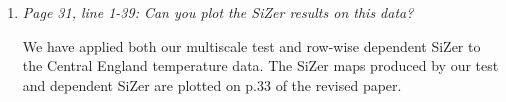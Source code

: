\documentclass[a4paper,12pt]{article}
\begin{document}
\begin{enumerate}[label=(\arabic*),leftmargin=0.7cm]
\item \textit{Page 31, line 1-39: Can you plot the SiZer results on this data?}

We have applied both our multiscale test and row-wise dependent SiZer to the Central England temperature data. The SiZer maps produced by our test and dependent SiZer are plotted on p.33 of the revised paper.  

\end{enumerate}



\newpage

{\small
\setlength{\bibsep}{0.45em}
}
\end{document}
